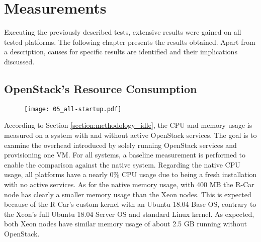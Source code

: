 \chapter{Measurements}
\label{chapter:measurements}
    
    Executing the previously described tests, extensive results were gained on all tested platforms.
    The following chapter presents the results obtained.
    Apart from a description, causes for specific results are identified and their implications  discussed.

    
    \section{OpenStack's Resource Consumption}
    \label{section:evaluation_consumption}
    
        \begin{figure}[ht]
          \centering
          \texttt{[image: 05\_all-startup.pdf]}
          \label{fig:all_idle}
        \end{figure}
        
        \newpage
        \noindent According to Section \ref{section:methodology_idle}, the CPU and memory usage is measured on a system with and without active OpenStack services.
        The goal is to examine the overhead introduced by solely running OpenStack services and provisioning one \ac{VM}.
        For all systems, a baseline measurement is performed to enable the comparison against the native system.
        Regarding the native CPU usage, all platforms have a nearly 0\% CPU usage due to being a fresh installation with no active services.
        As for the native memory usage, with 400 MB the R-Car node has clearly a smaller memory usage than the Xeon nodes. 
        This is expected because of the R-Car's custom kernel with an Ubuntu 18.04 Base \ac{OS}, contrary to the Xeon's full Ubuntu 18.04 Server \ac{OS} and standard Linux kernel.
        As expected, both Xeon nodes have similar memory usage of about 2.5 GB running without OpenStack.        
        
